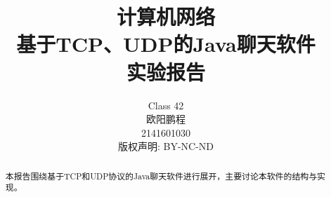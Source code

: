 \documentclass[]{report}
\title{计算机网络 \\ 基于TCP、UDP的Java聊天软件 \\ 实验报告}
\author{Class 42 \\ 欧阳鹏程 \\ 2141601030 \\ 版权声明: BY-NC-ND}
\begin{document}
\maketitle

\begin{abstract}
	本报告围绕基于TCP和UDP协议的Java聊天软件进行展开，主要讨论本软件的结构与实现。
\end{abstract}
\end{document}
